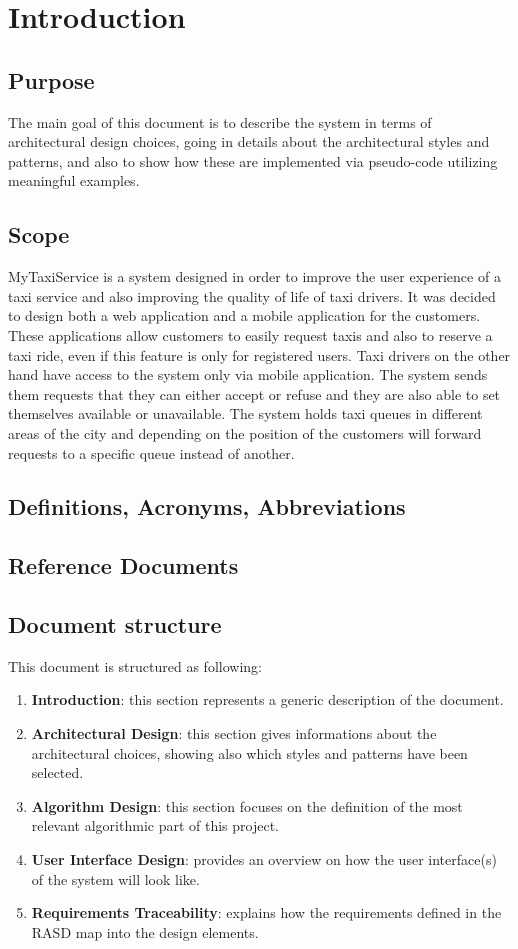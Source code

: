 \section{Introduction}
\subsection{Purpose}
The main goal of this document is to describe the system in terms of architectural design choices, going in details about the architectural styles and patterns, and also to show how these are implemented via pseudo-code utilizing meaningful examples.
\subsection{Scope}
MyTaxiService is a system designed in order to improve the user experience of a taxi service and also improving the quality of life of taxi drivers. It was decided to design both a web application and a mobile application for the customers. These applications allow customers to easily request taxis and also to reserve a taxi ride, even if this feature is only for registered users. Taxi drivers on the other hand have access to the system only via mobile application. The system sends them requests that they can either accept or refuse and they are also able to set themselves available or unavailable. The system holds taxi queues in different areas of the city and depending on the position of the customers will forward requests to a specific queue instead of another. 
\subsection{Definitions, Acronyms, Abbreviations}
\subsection{Reference Documents}
\begin{itemize}
\end{itemize}
\subsection{Document structure}
This document is structured as following:
\begin{enumerate}
	\item \textbf{Introduction}: this section represents a generic description of the document.
	\item \textbf{Architectural Design}: this section gives informations about the architectural choices, showing also which styles and patterns have been selected.
	\item \textbf{Algorithm Design}: this section focuses on the definition of the most relevant
	algorithmic part of this project.
	\item \textbf{User Interface Design}: provides an overview on how the user interface(s) of the system will look like.
	\item \textbf{Requirements Traceability}: explains how the requirements defined in the RASD map	into the design elements.
\end{enumerate}